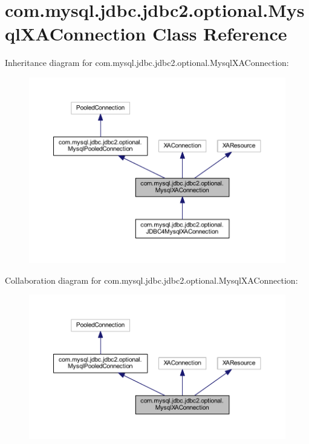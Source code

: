 \hypertarget{classcom_1_1mysql_1_1jdbc_1_1jdbc2_1_1optional_1_1_mysql_x_a_connection}{}\section{com.\+mysql.\+jdbc.\+jdbc2.\+optional.\+Mysql\+X\+A\+Connection Class Reference}
\label{classcom_1_1mysql_1_1jdbc_1_1jdbc2_1_1optional_1_1_mysql_x_a_connection}


Inheritance diagram for com.\+mysql.\+jdbc.\+jdbc2.\+optional.\+Mysql\+X\+A\+Connection\+:
\nopagebreak
\begin{figure}[H]
\begin{center}
\leavevmode
\includegraphics[width=350pt]{classcom_1_1mysql_1_1jdbc_1_1jdbc2_1_1optional_1_1_mysql_x_a_connection__inherit__graph}
\end{center}
\end{figure}


Collaboration diagram for com.\+mysql.\+jdbc.\+jdbc2.\+optional.\+Mysql\+X\+A\+Connection\+:
\nopagebreak
\begin{figure}[H]
\begin{center}
\leavevmode
\includegraphics[width=350pt]{classcom_1_1mysql_1_1jdbc_1_1jdbc2_1_1optional_1_1_mysql_x_a_connection__coll__graph}
\end{center}
\end{figure}
